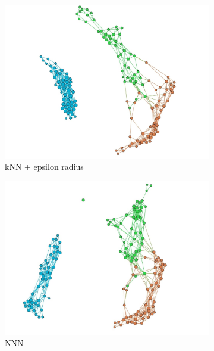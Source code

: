\documentclass[slovak,master,dept460,male,cpp,cpdeclaration]{diploma}
\begin{document}
\begin{figure}[H]
\centering
\begin{subfigure}{0.45\textwidth}
    \centering
    \includegraphics[width=\linewidth, frame]{Graphs/network_iris_knn_epsilon.jpg}
    \caption{kNN + epsilon radius}
    \label{fig:wine_knn_eps}
\end{subfigure}\hfil
\begin{subfigure}{0.45\textwidth}
    \centering
    \includegraphics[width=\linewidth, frame]{Graphs/network_iris_nnn.jpg}
    \caption{NNN}
    \label{fig:wine_nnn}
\end{subfigure}
\medskip
\begin{subfigure}{0.45\textwidth}
    \centering

\end{subfigure}
\end{figure}
\end{document}
